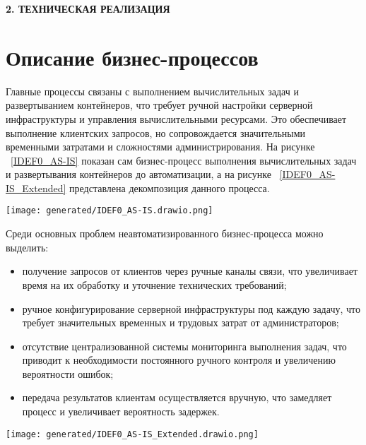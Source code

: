 \newpage
\begin{center}
  \textbf{\large 2. ТЕХНИЧЕСКАЯ РЕАЛИЗАЦИЯ}
\end{center}

\section{Описание бизнес-процессов}

Главные процессы связаны с выполнением вычислительных задач и развертыванием контейнеров, что требует ручной настройки серверной инфраструктуры и управления вычислительными ресурсами. Это обеспечивает выполнение клиентских запросов, но сопровождается значительными временными затратами и сложностями администрирования. На рисунке ~\ref{IDEF0_AS-IS} показан сам бизнес-процесс выполнения вычислительных задач и развертывания контейнеров до автоматизации, а на рисунке ~\ref{IDEF0_AS-IS_Extended} представлена декомпозиция данного процесса.

\begin{figure*}[!t]
  \centering
  \texttt{[image: generated/IDEF0\_AS-IS.drawio.png]}
  \caption{Процесс выполнения вычислений на удаленном сервере}
  \label{IDEF0_AS-IS}
\end{figure*}

Среди основных проблем неавтоматизированного бизнес-процесса можно выделить:
\begin{itemize}
  \item[---]получение запросов от клиентов через ручные каналы связи, что увеличивает время на их обработку и уточнение технических требований;
  \item[---]ручное конфигурирование серверной инфраструктуры под каждую задачу, что требует значительных временных и трудовых затрат от администраторов;
  \item[---]отсутствие централизованной системы мониторинга выполнения задач, что приводит к необходимости постоянного ручного контроля и увеличению вероятности ошибок;
  \item[---]передача результатов клиентам осуществляется вручную, что замедляет процесс и увеличивает вероятность задержек.
\end{itemize}

\begin{figure*}[!t]
  \centering
  \texttt{[image: generated/IDEF0\_AS-IS\_Extended.drawio.png]}
  \caption{Декомпозиция процесса выполения удаленных вычислений}
  \label{IDEF0_AS-IS_Extended}
\end{figure*}

